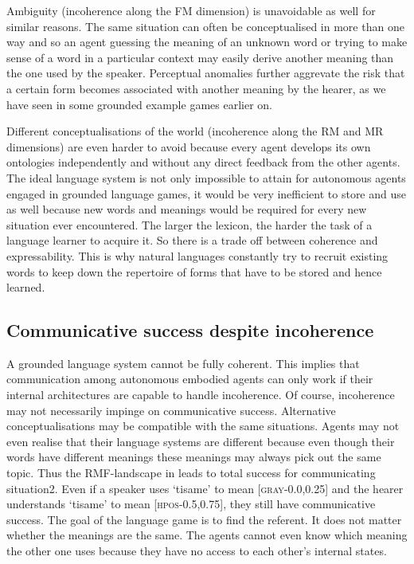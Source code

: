 Ambiguity (incoherence along the FM dimension) 
is unavoidable as well for similar reasons. 
The same situation can often be conceptualised in more than 
one way and so an agent guessing the meaning of an unknown 
word or trying to make sense of a word in a particular 
context may easily derive another meaning than the one 
used by the speaker. Perceptual anomalies further aggrevate
the risk that a certain form becomes associated with 
another meaning by the hearer, as we have seen in some
grounded example games earlier on. 

Different conceptualisations of the world (incoherence 
along the RM and MR dimensions) are even harder to 
avoid because every agent develops its own 
ontologies independently and without any direct 
feedback from the other agents. 
The ideal language system is not only impossible to 
attain for autonomous agents engaged in grounded
language games, it would be very 
inefficient to store and use as well because 
new words and meanings would be required for every new 
situation ever encountered. The larger the lexicon,
the harder the task of a language learner to acquire it. 
So there is a trade off between coherence and expressability. 
This is why natural languages constantly try to recruit existing 
words to keep down the repertoire of 
forms that have to be stored and hence learned.

\subsection{Communicative success despite incoherence}

A grounded language system cannot be fully coherent. 
This implies that communication among autonomous 
embodied agents can only work if their internal 
architectures are capable to handle incoherence. 
Of course, incoherence may not necessarily 
impinge on communicative success. 
Alternative conceptualisations may 
be compatible with the same situations. Agents may not
even realise that their language systems are different
because even though their words have different 
meanings these meanings may always pick out the 
same topic. Thus 
the RMF-landscape in  leads to total
success for communicating situation2. Even if 
a speaker uses `tisame' to mean [\textsc{gray}-0.0,0.25] and the hearer
understands `tisame' to mean [\textsc{hpos}-0.5,0.75], they 
still have communicative success. The goal 
of the language game is to find the referent. It does
not matter whether the meanings are the same. The agents
cannot even know which meaning the other one uses
because they have no access to each other's internal states. 

